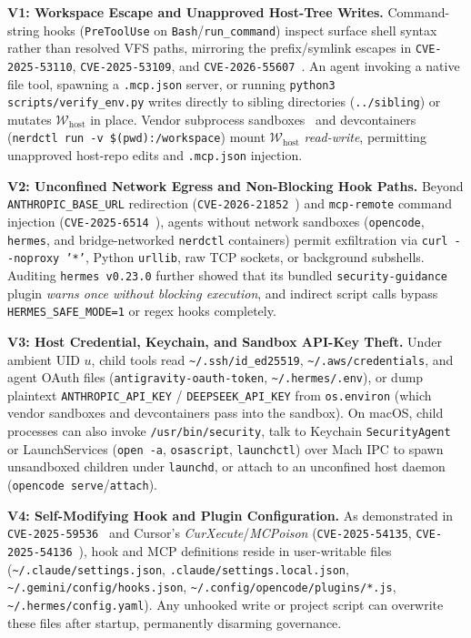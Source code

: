 \documentclass[10pt,journal,compsoc]{IEEEtran}
\begin{document}
\noindent\textbf{V1: Workspace Escape and Unapproved Host-Tree Writes.}
Command-string hooks (\texttt{PreToolUse} on \texttt{Bash}/\texttt{run\_command}) inspect surface shell syntax rather than resolved VFS paths, mirroring the prefix/symlink escapes in \texttt{CVE-2025-53110}, \texttt{CVE-2025-53109}, and \texttt{CVE-2026-55607}~\cite{nvd2026agentfs}. An agent invoking a native file tool, spawning a \texttt{.mcp.json} server, or running \texttt{python3 scripts/verify\_env.py} writes directly to sibling directories (\texttt{../sibling}) or mutates $\mathcal{W}_{\text{host}}$ in place. Vendor subprocess sandboxes~\cite{anthropic2025srt} and devcontainers (\texttt{nerdctl run -v \$(pwd):/workspace}) mount $\mathcal{W}_{\text{host}}$ \emph{read-write}, permitting unapproved host-repo edits and \texttt{.mcp.json} injection.

\noindent\textbf{V2: Unconfined Network Egress and Non-Blocking Hook Paths.}
Beyond \texttt{ANTHROPIC\_BASE\_URL} redirection (\texttt{CVE-2026-21852}~\cite{checkpoint2026hook}) and \texttt{mcp-remote} command injection (\texttt{CVE-2025-6514}~\cite{nvd2025mcpremote}), agents without network sandboxes (\texttt{opencode}, \texttt{hermes}, and bridge-networked \texttt{nerdctl} containers) permit exfiltration via \texttt{curl -\/-noproxy '*'}, Python \texttt{urllib}, raw TCP sockets, or background subshells. Auditing \texttt{hermes v0.23.0} further showed that its bundled \texttt{security-guidance} plugin \emph{warns once without blocking execution}, and indirect script calls bypass \texttt{HERMES\_SAFE\_MODE=1} or regex hooks completely.

\noindent\textbf{V3: Host Credential, Keychain, and Sandbox API-Key Theft.}
Under ambient UID $u$, child tools read \texttt{\textasciitilde/.ssh/id\_ed25519}, \texttt{\textasciitilde/.aws/credentials}, and agent OAuth files (\texttt{antigravity-oauth-token}, \texttt{\textasciitilde/.hermes/.env}), or dump plaintext \texttt{ANTHROPIC\_API\_KEY} / \texttt{DEEPSEEK\_API\_KEY} from \texttt{os.environ} (which vendor sandboxes and devcontainers pass into the sandbox). On macOS, child processes can also invoke \texttt{/usr/bin/security}, talk to Keychain \texttt{SecurityAgent} or LaunchServices (\texttt{open -a}, \texttt{osascript}, \texttt{launchctl}) over Mach IPC to spawn unsandboxed children under \texttt{launchd}, or attach to an unconfined host daemon (\texttt{opencode serve}/\texttt{attach}).

\noindent\textbf{V4: Self-Modifying Hook and Plugin Configuration.}
As demonstrated in \texttt{CVE-2025-59536}~\cite{checkpoint2026hook} and Cursor's \emph{CurXecute}/\emph{MCPoison} (\texttt{CVE-2025-54135}, \texttt{CVE-2025-54136}~\cite{nvd2025mcpremote}), hook and MCP definitions reside in user-writable files (\texttt{\textasciitilde/.claude/settings.json}, \texttt{.claude/settings.local.json}, \texttt{\textasciitilde/.gemini/config/hooks.json}, \texttt{\textasciitilde/.config/opencode/plugins/*.js}, \texttt{\textasciitilde/.hermes/config.yaml}). Any unhooked write or project script can overwrite these files after startup, permanently disarming governance.
\end{document}
